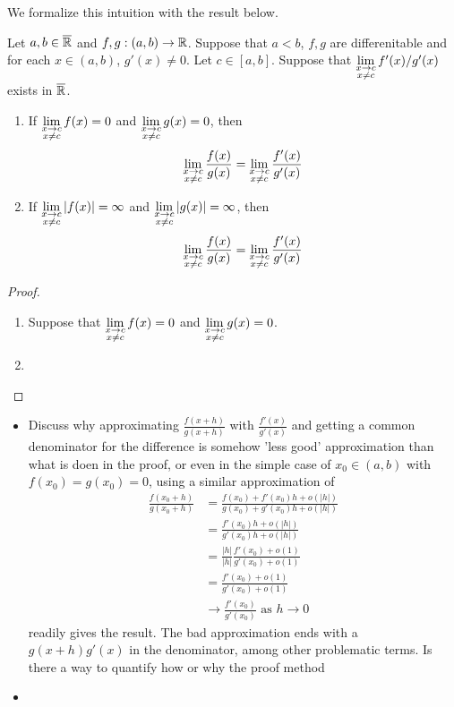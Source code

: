\documentclass{book}
\begin{document}
	We formalize this intuition with the result below. 
	
	\begin{ex} 
		Let $a,b \in \overline{\mathbb{R}}$ and $f,g: (a,b) \rightarrow \mathbb{R}$. Suppose that $a < b$, $f,g$ are differenitable and for each $x \in (a,b)$, $g'(x) \neq 0$. Let $c \in [a,b]$. Suppose that $\lim\limits_{\substack{x \rightarrow c \\ x \neq c}} f'(x)/g'(x)$ exists in $\overline{\mathbb{R}}$. 
		\begin{enumerate}
			\item If $\lim\limits_{\substack{x \rightarrow c \\ x \neq c}} f(x) = 0$ and $\lim\limits_{\substack{x \rightarrow c \\ x \neq c}} g(x) = 0$, then 
			$$\lim\limits_{\substack{x \rightarrow c \\ x \neq c}} \frac{f(x)}{g(x)} = \lim\limits_{\substack{x \rightarrow c \\ x \neq c}} \frac{f'(x)}{g'(x)}$$
			\item If $\lim\limits_{\substack{x \rightarrow c \\ x \neq c}} |f(x)| = \infty$ and $\lim\limits_{\substack{x \rightarrow c \\ x \neq c}} |g(x)| = \infty$, then 
			$$\lim\limits_{\substack{x \rightarrow c \\ x \neq c}} \frac{f(x)}{g(x)} = \lim\limits_{\substack{x \rightarrow c \\ x \neq c}} \frac{f'(x)}{g'(x)}$$
		\end{enumerate}
	\end{ex}
	
	\begin{proof}\
		\begin{enumerate}
			\item Suppose that $\lim\limits_{\substack{x \rightarrow c \\ x \neq c}} f(x) = 0$ and $\lim\limits_{\substack{x \rightarrow c \\ x \neq c}} g(x) = 0$. 
			\item 
		\end{enumerate}
	\end{proof}
	
	\begin{note}
		\begin{itemize}
			\item Discuss why approximating $\frac{f(x + h)}{g(x + h)}$ with $\frac{f'(x)}{g'(x)}$ and getting a common denominator for the difference is somehow 'less good' approximation than what is doen in the proof, or even in the simple case of $x_0 \in (a,b)$ with $f(x_0) = g(x_0) = 0$, using a similar approximation of 
			\begin{align*}
				\frac{f(x_0 + h)}{g(x_0 + h)}
				& = \frac{f(x_0) + f'(x_0)h + o(|h|)}{g(x_0) + g'(x_0)h + o(|h|)} \\
				& = \frac{f'(x_0)h + o(|h|)}{g'(x_0)h + o(|h|)} \\
				& = \frac{|h|}{|h|}\frac{f'(x_0) + o(1)}{g'(x_0) + o(1)} \\
				& = \frac{f'(x_0) + o(1)}{g'(x_0) + o(1)} \\
				& \text{$\rightarrow \frac{f'(x_0) }{g'(x_0)}$ as $h \rightarrow 0$} 
			\end{align*}
			readily gives the result. The bad approximation ends with a $g(x+h)g'(x)$ in the denominator, among other problematic terms. Is there a way to quantify how or why the proof method
			\item {}
		\end{itemize}
	\end{note}
	
\end{document}
